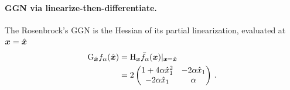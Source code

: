 \begin{example}
  \paragraph{GGN via linearize-then-differentiate.}
  The Rosenbrock's GGN is the Hessian of its partial linearization, evaluated at ${\bm{x}} = \hat{{\bm{x}}}$
  \begin{align*}
    \mathrm{G}_{\hat{{\bm{x}}}} f_{\alpha}(\hat{{\bm{x}}})
    &=
      \mathrm{H}_{{\bm{x}}} \bar{f}_{\alpha}({\bm{x}})|_{{\bm{x}}=\hat{{\bm{x}}}}
    \\
    &=
      2
      \begin{pmatrix}
        1 + 4 \alpha \hat{x}_1^2 & - 2\alpha \hat{x}_1
        \\
        - 2\alpha \hat{x}_1 & \alpha
      \end{pmatrix}\,.
  \end{align*}


\end{example}
